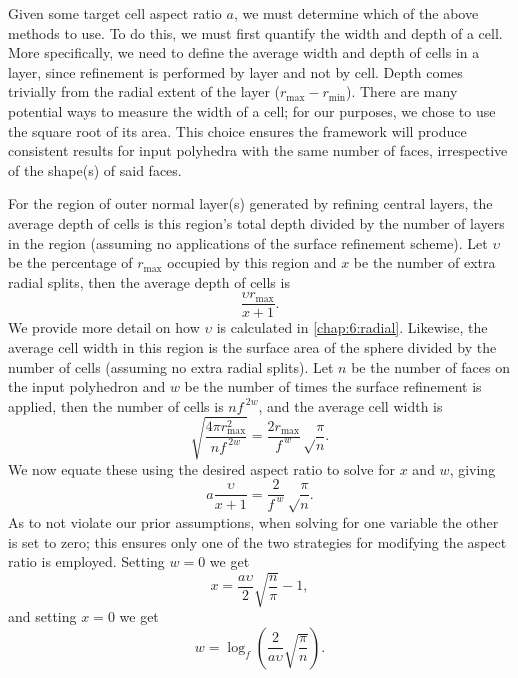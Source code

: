 Given some target cell aspect ratio $a$, we must determine which of the above methods to use.
To do this, we must first quantify the width and depth of a cell.
More specifically, we need to define the average width and depth of cells in a layer, since refinement is performed by layer and not by cell.
Depth comes trivially from the radial extent of the layer ($r_\mathrm{max} - r_\mathrm{min}$).
There are many potential ways to measure the width of a cell; for our purposes, we chose to use the square root of its area.
This choice ensures the framework will produce consistent results for input polyhedra with the same number of faces, irrespective of the shape(s) of said faces.


For the region of outer normal layer(s) generated by refining central layers, the average depth of cells is this region's total depth divided by the number of layers in the region (assuming no applications of the surface refinement scheme).
Let $\upsilon$ be the percentage of $r_\mathrm{max}$ occupied by this region and $x$ be the number of extra radial splits, then the average depth of cells is
%
\begin{equation*}
\frac{\upsilon r_\mathrm{max}}{x+1}.
\end{equation*}
%
We provide more detail on how $\upsilon$ is calculated in \cref{chap:6:radial}.
Likewise, the average cell width in this region is the surface area of the sphere divided by the number of cells (assuming no extra radial splits).
Let $n$ be the number of faces on the input polyhedron and $w$ be the number of times the surface refinement is applied, then the number of cells is $n f^{\ 2w}$, and the average cell width is
%
\begin{equation*}
\sqrt{ \frac{ 4 \pi r_\mathrm{max}^2 }{ n f^{\ 2 w} } } = \frac{2 r_\mathrm{max}}{f^{\ w}} \sqrt\frac{\pi}{n}.
\end{equation*}
%
We now equate these using the desired aspect ratio to solve for $x$ and $w$, giving
%
\begin{equation*}
a \frac{\upsilon}{x+1} = \frac{2}{f^{\ w}} \sqrt\frac{\pi}{n}.
\end{equation*}
%
As to not violate our prior assumptions, when solving for one variable the other is set to zero; this ensures only one of the two strategies for modifying the aspect ratio is employed.
Setting $w = 0$ we get
%
\begin{equation} \label{eq:extraSplits}
x = \frac{a \upsilon}{2} \sqrt{\frac{n}{\pi}} - 1,
\end{equation}
%
and setting $x = 0$ we get
%
\begin{equation} \label{eq:extraSurface}
w = \log_{f} \left( \frac{2}{a \upsilon} \sqrt{ \frac{\pi}{n}} \right).
\end{equation}


